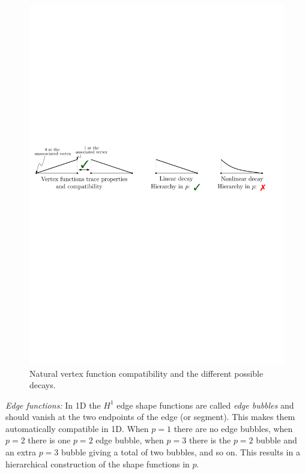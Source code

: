\begin{figure}[!ht]
\begin{center}
\includegraphics[scale=0.7]{./figures/VertexCompatibilityAndBlending.pdf}
\caption{Natural vertex function compatibility and the different possible decays.}
\label{fig:vertexcompatibility}
\end{center}
\end{figure}

\textit{Edge functions:} In 1D the $H^1$ edge shape functions are called \textit{edge bubbles} and should vanish at the two endpoints of the edge (or segment).
This makes them automatically compatible in 1D.
When $p=1$ there are no edge bubbles, when $p=2$ there is one $p=2$ edge bubble, when $p=3$ there is the $p=2$ bubble and an extra $p=3$ bubble giving a total of two bubbles, and so on.
This results in a hierarchical construction of the shape functions in $p$.

